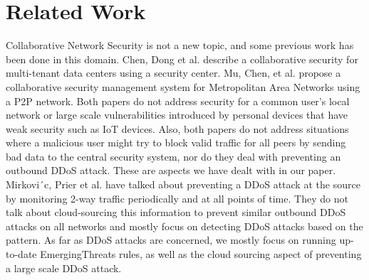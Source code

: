 \vspace{0.1in}
\section{Related Work}
\label{sec:related}

Collaborative Network Security is not a new topic, and some previous work has been done in this domain. Chen,  Dong et al. \cite {collaborative} describe a collaborative security for multi-tenant data centers using a security center. Mu, Chen, et al. \cite {metro} propose a collaborative security management system for Metropolitan Area Networks using a P2P network. Both papers do not address security for a common user's local network or large scale vulnerabilities introduced by personal devices that have weak security such as IoT devices. Also, both papers do not address situations where a malicious user might try to block valid traffic for all peers by sending bad data to the central security system, nor do they deal with preventing an outbound DDoS attack. These are aspects we have dealt with in our paper. Mirkovi´c, Prier et al. \cite{attackddos} have talked about preventing a DDoS attack at the source by monitoring 2-way traffic periodically and at all points of time. They do not talk about cloud-sourcing this information to prevent similar outbound DDoS attacks on all networks and mostly focus on detecting DDoS attacks based on the pattern. As far as DDoS attacks are concerned, we mostly focus on running up-to-date EmergingThreats rules, as well as the cloud sourcing aspect of preventing a large scale DDoS attack.